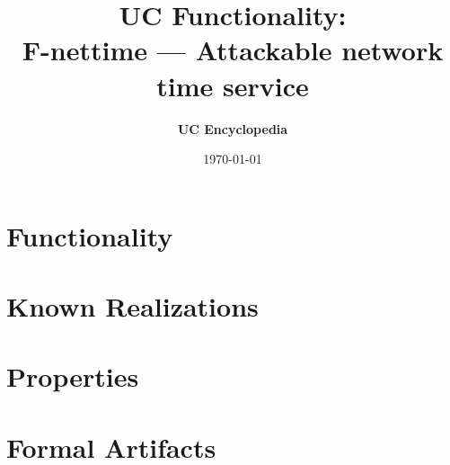\documentclass[11pt,a4paper]{article}
\title{\textbf{\Large UC Functionality:}\\[0.2em] \Large F-nettime --- Attackable network time service}
\author{\textbf{UC Encyclopedia}}
\date{\today}
\newtheorem{functionality}{Functionality}
\begin{document}
\maketitle

\begin{abstract}
\end{abstract}

\section{Functionality}

%

\section{Known Realizations}


\section{Properties}


\section{Formal Artifacts}

\end{document}
